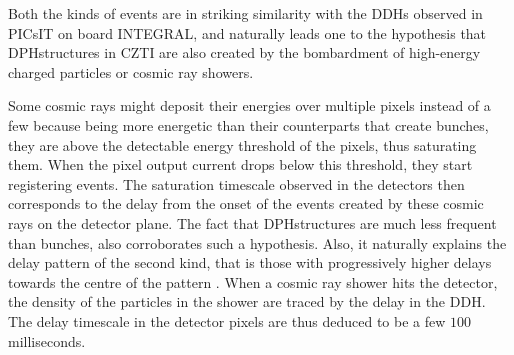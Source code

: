 Both the kinds of events are in striking similarity with the DDHs observed in PICsIT on board INTEGRAL, and naturally leads one to the hypothesis that DPHstructures in CZTI are also created by the bombardment of high-energy charged particles or cosmic ray showers.

Some cosmic rays might deposit their energies over multiple pixels instead of a few because being more energetic than their counterparts that create bunches, they are above the detectable energy threshold of the pixels, thus saturating them. When the pixel output current drops below this threshold, they start registering events. The saturation timescale observed in the detectors then corresponds to the delay from the onset of the events created by these cosmic rays on the detector plane. The fact that DPHstructures are much less frequent than bunches, also corroborates such a hypothesis. Also, it naturally explains the delay pattern of the second kind, that is those with progressively higher delays towards the centre of the pattern . When a cosmic ray shower hits the detector, the density of the particles in the shower are traced by the delay in the DDH. The delay timescale in the detector pixels are thus deduced to be a few $100$ milliseconds.


